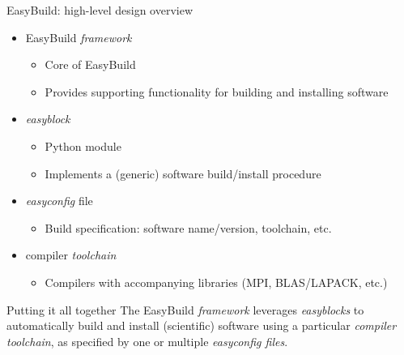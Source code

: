 \documentclass[10pt,xcolor={usenames,dvipsnames}]{beamer}
\begin{document}
\begin{frame}{EasyBuild: high-level design overview}
\begin{itemize}
    \item
        EasyBuild \emph{framework}
        \begin{itemize}
            \item
                Core of EasyBuild
            \item
                Provides supporting functionality for building and installing software
        \end{itemize}
    \item
        \emph{easyblock}
        \begin{itemize}
            \item
                Python module
            \item
                Implements a (generic) software build/install procedure
        \end{itemize}
    \item
        \emph{easyconfig} file
        \begin{itemize}
            \item
                Build specification: software name/version, toolchain, etc.
        \end{itemize}
    \item
        compiler \emph{toolchain}
        \begin{itemize}
            \item
                Compilers with accompanying libraries (MPI, BLAS/LAPACK, etc.)
        \end{itemize}
\end{itemize}

\medskip\quad\quad
\begin{minipage}{0.9\textwidth}
    \begin{block}{Putting it all together}
        The EasyBuild \emph{framework} leverages \emph{easyblocks} to
        automatically build and install (scientific) software using a
        particular \emph{compiler toolchain}, as specified by one or multiple
        \emph{easyconfig files}.
    \end{block}
\end{minipage}
\end{frame}

\end{document}
